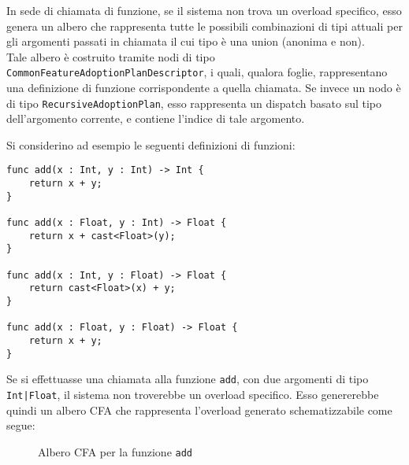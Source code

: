 In sede di chiamata di funzione, se il sistema non trova un overload specifico, esso genera un albero che rappresenta tutte le 
possibili combinazioni di tipi attuali per gli argomenti passati in chiamata il cui tipo è una union (anonima e non). \\

Tale albero è costruito tramite nodi di tipo \texttt{CommonFeatureAdoptionPlanDescriptor}, i quali, qualora foglie, rappresentano
una definizione di funzione corrispondente a quella chiamata. Se invece un nodo è di tipo \texttt{RecursiveAdoptionPlan}, esso rappresenta
un dispatch basato sul tipo dell'argomento corrente, e contiene l'indice di tale argomento.

\newpage

Si considerino ad esempio le seguenti definizioni di funzioni:

\vspace{0.5cm}
\begin{lstlisting}[frame=single]
func add(x : Int, y : Int) -> Int {
    return x + y;
}

func add(x : Float, y : Int) -> Float {
    return x + cast<Float>(y);
}

func add(x : Int, y : Float) -> Float {
    return cast<Float>(x) + y;
}

func add(x : Float, y : Float) -> Float {
    return x + y;
}

\end{lstlisting}
\vspace{0.5cm}

Se si effettuasse una chiamata alla funzione \texttt{add}, con due argomenti di tipo \texttt{Int|Float}, il sistema non troverebbe un overload
specifico. Esso genererebbe quindi un albero CFA che rappresenta l'overload generato schematizzabile come segue:

\begin{figure}[h]
    \centering
    \caption{Albero CFA per la funzione \texttt{add}}
    \label{fig:overload_tree}
\end{figure}